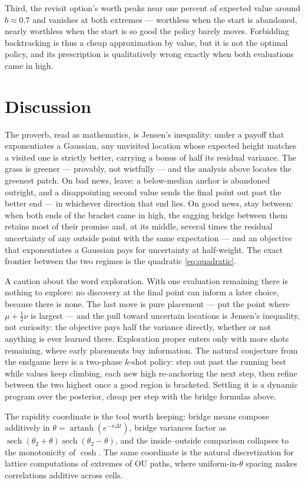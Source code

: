\documentclass[11pt]{article}
\theoremstyle{itheads}
\newcommand{\sech}{\operatorname{sech}}
\newcommand{\artanh}{\operatorname{artanh}}
\begin{document}
Third, the revisit option's worth peaks near one percent of expected
value around $b\approx0.7$ and vanishes at both extremes --- worthless
when the start is abandoned, nearly worthless when the start is so good
the policy barely moves. Forbidding backtracking is thus a cheap
approximation by value, but it is not the optimal policy, and its
prescription is qualitatively wrong exactly when both evaluations came
in high.

\section{Discussion}

The proverb, read as mathematics, is Jensen's inequality: under a
payoff that exponentiates a Gaussian, any unvisited location whose
expected height matches a visited one is strictly better, carrying a
bonus of half its residual variance. The grass is greener --- provably,
not wistfully --- and the analysis above locates the greenest patch.
On bad news, leave: a below-median
anchor is abandoned outright, and a disappointing second value sends
the final point out past the better end --- in whichever direction
that end lies. On good news, stay between: when both ends
of the bracket came in high, the sagging bridge between them retains
most of their promise and, at its middle, several times the residual
uncertainty of any outside point with the same expectation --- and an
objective that exponentiates a Gaussian pays for uncertainty at
half-weight. The exact frontier between the two regimes is the
quadratic \eqref{eq:quadratic}.

A caution about the word exploration. With one evaluation remaining
there is nothing to explore: no discovery at the final point can
inform a later choice, because there is none. The last move is pure
placement --- put the point where $\mu+\tfrac12\nu$ is largest ---
and the pull toward uncertain locations is Jensen's inequality, not
curiosity: the objective pays half the variance directly, whether or
not anything is ever learned there. Exploration proper enters only
with more shots remaining, where early placements buy information. The
natural conjecture from the endgame here is a two-phase $k$-shot
policy: step out past the running best while values keep climbing,
each new high re-anchoring the next step, then refine between the two
highest once a good region is bracketed. Settling it is a dynamic program over the posterior, cheap
per step with the bridge formulas above.

The rapidity coordinate is the tool worth keeping: bridge means compose
additively in $\theta=\artanh(e^{-\kappa\Delta t})$, bridge variances
factor as $\sech(\theta_2+\theta)\sech(\theta_2-\theta)$, and the
inside--outside comparison collapses to the monotonicity of
$\cosh$. The same coordinate is the natural discretization for lattice
computations of extremes of OU paths, where uniform-in-$\theta$ spacing
makes correlations additive across cells.
\end{document}

